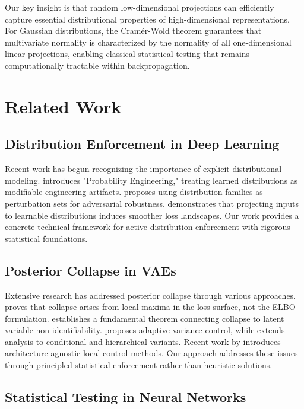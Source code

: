 \documentclass{article}
\begin{document}
Our key insight is that random low-dimensional projections can efficiently capture essential distributional properties of high-dimensional representations. For Gaussian distributions, the Cramér-Wold theorem guarantees that multivariate normality is characterized by the normality of all one-dimensional linear projections, enabling classical statistical testing that remains computationally tractable within backpropagation.

\section{Related Work}

\subsection{Distribution Enforcement in Deep Learning}

Recent work has begun recognizing the importance of explicit distributional modeling. \citet{zhang2025advancing} introduces "Probability Engineering," treating learned distributions as modifiable engineering artifacts. \citet{ahmadi2024distributional} proposes using distribution families as perturbation sets for adversarial robustness. \citet{hao2025towards} demonstrates that projecting inputs to learnable distributions induces smoother loss landscapes. Our work provides a concrete technical framework for active distribution enforcement with rigorous statistical foundations.

\subsection{Posterior Collapse in VAEs}

Extensive research has addressed posterior collapse through various approaches. \citet{lucas2019don} proves that collapse arises from local maxima in the loss surface, not the ELBO formulation. \citet{wang2023posterior} establishes a fundamental theorem connecting collapse to latent variable non-identifiability. \citet{takida2022preventing} proposes adaptive variance control, while \citet{dang2024beyond} extends analysis to conditional and hierarchical variants. Recent work by \citet{song2024toward} introduces architecture-agnostic local control methods. Our approach addresses these issues through principled statistical enforcement rather than heuristic solutions.

\subsection{Statistical Testing in Neural Networks}
\end{document}
